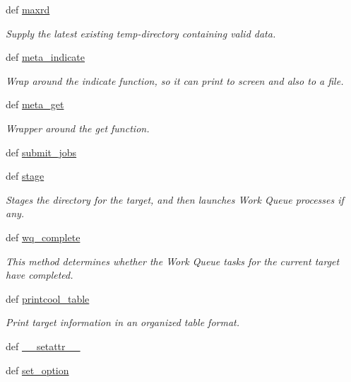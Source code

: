 \begin{DoxyCompactItemize}
def \hyperlink{classforcebalance_1_1target_1_1Target_a961ce7e772836b1465cb44e3f03145df}{maxrd}
\begin{DoxyCompactList}\small\item\em Supply the latest existing temp-\/directory containing valid data. \end{DoxyCompactList}\item 
def \hyperlink{classforcebalance_1_1target_1_1Target_a99c84ef8ea504d7699c927e261f648e4}{meta\-\_\-indicate}
\begin{DoxyCompactList}\small\item\em Wrap around the indicate function, so it can print to screen and also to a file. \end{DoxyCompactList}\item 
def \hyperlink{classforcebalance_1_1target_1_1Target_a17c8ac0c7dd0a0430accddfd12602103}{meta\-\_\-get}
\begin{DoxyCompactList}\small\item\em Wrapper around the get function. \end{DoxyCompactList}\item 
def \hyperlink{classforcebalance_1_1target_1_1Target_a78cd29b94cbcc201eed99c78aaef46a4}{submit\-\_\-jobs}
\item 
def \hyperlink{classforcebalance_1_1target_1_1Target_af8d2a4658c87841e40296795aec478bb}{stage}
\begin{DoxyCompactList}\small\item\em Stages the directory for the target, and then launches Work Queue processes if any. \end{DoxyCompactList}\item 
def \hyperlink{classforcebalance_1_1target_1_1Target_af6099ec09486213869dba2491bd8ea04}{wq\-\_\-complete}
\begin{DoxyCompactList}\small\item\em This method determines whether the Work Queue tasks for the current target have completed. \end{DoxyCompactList}\item 
def \hyperlink{classforcebalance_1_1target_1_1Target_ac30a4e9d7d9fe06f7caefa5f7cfab09b}{printcool\-\_\-table}
\begin{DoxyCompactList}\small\item\em Print target information in an organized table format. \end{DoxyCompactList}\item 
def \hyperlink{classforcebalance_1_1BaseClass_a0c851d413c3b2f30561b72a46771bcff}{\-\_\-\-\_\-setattr\-\_\-\-\_\-}
\item 
def \hyperlink{classforcebalance_1_1BaseClass_a73e9a37a7632e79eb99f49bd15aced45}{set\-\_\-option}
\end{DoxyCompactItemize}
